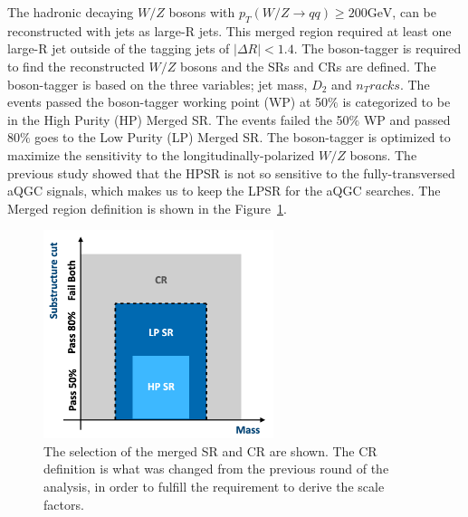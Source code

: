 The hadronic decaying $W/Z$ bosons with $p_{T}(W / Z \rightarrow q q) \geq 200 \mathrm{GeV}$, can be reconstructed with jets as large-R jets. This merged region required at least one large-R jet outside of the tagging jets of $|\Delta R|<1.4$. 
The boson-tagger is required to find the reconstructed $W/Z$ bosons and the SRs and CRs are defined. The boson-tagger is based on the three variables; jet mass, $D_2$ and $n_Tracks$. The events passed the boson-tagger working point (WP) at 50$\%$ is categorized to be in the High Purity (HP) Merged SR. The events failed the 50$\%$ WP and passed 80$\%$ goes to the Low Purity (LP) Merged SR. 
The boson-tagger is optimized to maximize the sensitivity to the longitudinally-polarized $W/Z$ bosons. 
The previous study showed that the HPSR is not so sensitive to the fully-transversed aQGC signals, which makes us to keep the LPSR for the aQGC searches. 
The Merged region definition is shown in the Figure~\ref{fig:MergedRegion}.
\begin{figure}[ht]
    \centering
    \includegraphics[width=0.6\textwidth]{figures/MergedRegion}
    \caption{The selection of the merged SR and CR are shown. The CR definition is what was changed from the previous round of the analysis, in order to fulfill the requirement to derive the scale factors.}
    \label{fig:MergedRegion}
\end{figure}



